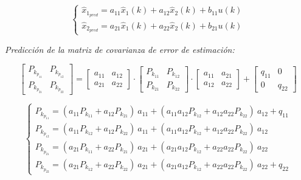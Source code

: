 \vspace{-0.5cm}
\begin{equation}
    \begin{cases}
        \hat{x}_{1_{pred}} = a_{11} \hat{x}_{1}(k) + a_{12} \hat{x}_{2}(k) + b_{11} u(k)
        \\
        \hat{x}_{2_{pred}} = a_{21} \hat{x}_{1}(k) + a_{22} \hat{x}_{2}(k) + b_{21} u(k)
    \end{cases}
\end{equation}
\vspace{-0.5cm}

\textit{Predicción de la matriz de covarianza de error de estimación:}

\vspace{-0.5cm}
\begin{equation}
    \begin{bmatrix}
        P_{k_{p_{11}}} & P_{k_{p_{12}}} \\
        P_{k_{p_{21}}} & P_{k_{p_{22}}}
    \end{bmatrix}
    =
    \begin{bmatrix}
        a_{11} & a_{12} \\
        a_{21} & a_{22}
    \end{bmatrix}
    \cdot
    \begin{bmatrix}
        P_{k_{11}} & P_{k_{12}} \\
        P_{k_{21}} & P_{k_{22}}
    \end{bmatrix}
    \cdot
    \begin{bmatrix}
        a_{11} & a_{21} \\
        a_{12} & a_{22}
    \end{bmatrix}
    +
    \begin{bmatrix}
        q_{11} & 0 \\
        0 & q_{22}
    \end{bmatrix}
\end{equation}
\vspace{-0.5cm}

\vspace{-0.5cm}
\begin{equation}
    \begin{cases}
        P_{k_{p_{11}}} = (a_{11}P_{k_{11}} + a_{12}P_{k_{21}})\ a_{11} + (a_{11}a_{12}P_{k_{12}} + a_{12}a_{22}P_{k_{22}})\ a_{12} + q_{11}
        \\
        P_{k_{p_{12}}} = (a_{11}P_{k_{12}} + a_{12}P_{k_{22}})\ a_{11} + (a_{11}a_{12}P_{k_{12}} + a_{12}a_{22}P_{k_{22}})\ a_{12}
        \\
        P_{k_{p_{21}}} = (a_{21}P_{k_{11}} + a_{22}P_{k_{21}})\ a_{21} + (a_{21}a_{12}P_{k_{12}} + a_{22}a_{22}P_{k_{22}})\ a_{22}
        \\
        P_{k_{p_{22}}} = (a_{21}P_{k_{12}} + a_{22}P_{k_{22}})\ a_{21} + (a_{21}a_{12}P_{k_{12}} + a_{22}a_{22}P_{k_{22}})\ a_{22} + q_{22}
    \end{cases}
\end{equation}
\vspace{-0.5cm}

